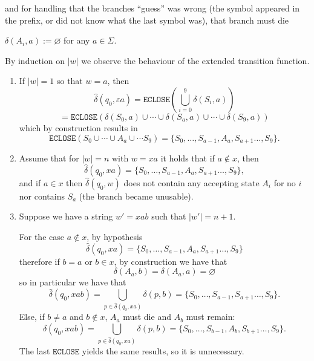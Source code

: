 \documentclass{article}
\theoremstyle{remark}
\begin{document}
\begin{enumerate}
\begin{enumerate}
        and for handling that the branches ``guess'' was wrong (the symbol appeared in the prefix, or did not know what the last symbol was), 
        that branch must die
        \begin{center}
            $\delta(A_i, a) := \varnothing$ for any $a \in \Sigma$.
        \end{center}
        
        By induction on $\vert w \vert$ we observe the behaviour of the extended transition function.
        \begin{enumerate}
            \item[\textbf{Basis.}] If $\vert w \vert = 1$ so that $w = a$, then 
            \[
            \hat{\delta}(q_0, \varepsilon a) = \texttt{ECLOSE}\left(\bigcup_{i=0}^{9}\delta(S_i, a)\right)
            \]
            \[
            = \texttt{ECLOSE}(\delta(S_0,a) \cup \cdots \cup \delta(S_a,a) \cup \cdots \cup \delta(S_9,a))
            \]
            which by construction results in
            \[
            \texttt{ECLOSE}(S_0 \cup \cdots \cup A_a \cup \cdots S_9) = \{S_0, \dots, S_{a-1}, A_a, S_{a+1} \dots, S_9\}.
            \]
            \item[\textbf{Hypothesis.}] Assume that for $\vert w \vert = n$ with $w = xa$ it holds that
            if $a \notin x$, then
            \[
            \hat{\delta}(q_0, xa) = \{S_0, \dots, S_{a-1}, A_a, S_{a+1} \dots, S_9\},
            \]
            and if $a \in x$ then 
            $\hat{\delta}(q_0,w)$ does not contain any accepting state $A_i$ for no $i$ nor contains $S_a$ (the branch became unusable).

            \item[\textbf{Thesis.}] Suppose we have a string $w' = xab$ such that $\vert w' \vert = n+1$.
            
            For the case $a \notin x$, by hypothesis
            \[
            \hat{\delta}(q_0, xa) = \{S_0, \dots, S_{a-1}, A_a, S_{a+1} \dots, S_9\}
            \]
            therefore if $b = a$ or $b \in x$, by construction we have that
            \[
            \delta(A_a, b) = \delta(A_a, a) = \varnothing
            \]
            so in particular we have that 
            \[
            \hat{\delta}(q_0, xab) = \bigcup_{p\in\hat{\delta}(q_0,xa)}\delta(p,b) =\{S_0, \dots, S_{a-1}, S_{a+1} \dots, S_9\}.
            \]
            Else, if $b \neq a$ and $b\notin x$, $A_a$ must die and $A_b$ must remain:
            \[
            \hat{\delta}(q_0, xab) = \bigcup_{p\in\hat{\delta}(q_0,xa)}\delta(p,b) =\{S_0, \dots, S_{b-1}, A_{b}, S_{b+1} \dots, S_9\}.
            \]
            The last $\texttt{ECLOSE}$ yields the same results, so it is unnecessary.
            

\end{enumerate}
\end{enumerate}
\end{enumerate}
\end{document}
